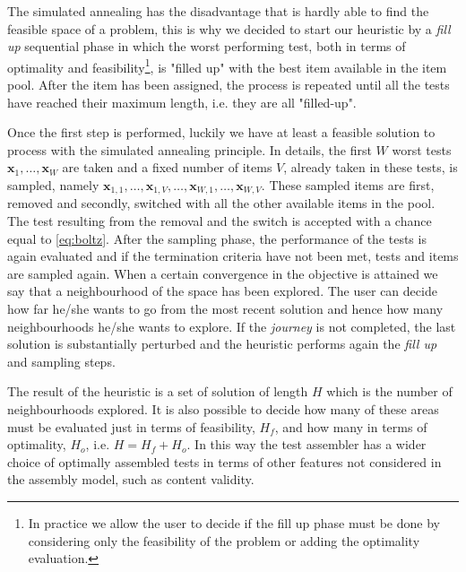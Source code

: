 The simulated annealing has the disadvantage that is hardly able to find the feasible space of a problem, this is why we decided to start our heuristic by a \emph{fill up} sequential phase in which the worst performing test, both in terms of optimality and feasibility\footnote{In practice we allow the user to decide if the fill up phase must be done by considering only the feasibility of the problem or adding the optimality evaluation.}, is "filled up" with the best item available in the item pool. After the item has been assigned, the process is repeated until all the tests have reached their maximum length, i.e. they are all "filled-up".

Once the first step is performed, luckily we have at least a feasible solution to process with the simulated annealing principle. In details, the first $W$ worst tests $\mathbf{x}_1,\ldots,\mathbf{x}_W$ are taken and a fixed number of items $V$, already taken in these tests, is sampled, namely $\mathbf{x}_{1,1},\ldots,\mathbf{x}_{1,V}, \ldots, \mathbf{x}_{W,1}, \ldots, \mathbf{x}_{W,V} $. These sampled items are first, removed and secondly, switched with all the other available items in the pool. The test resulting from the removal and the switch is accepted with a chance equal to \eqref{eq:boltz}. After the sampling phase, the performance of the tests is again evaluated and if the termination criteria have not been met, tests and items are sampled again. When a certain convergence in the objective is attained we say that a neighbourhood of the space has been explored. The user can decide how far he/she wants to go from the most recent solution and hence how many neighbourhoods he/she wants to explore. If the \emph{journey} is not completed, the last solution is substantially perturbed and the heuristic performs again the \emph{fill up} and sampling steps. 

The result of the heuristic is a set of solution of length $H$ which is the number of neighbourhoods explored. It is also possible to decide how many of these areas must be evaluated just in terms of feasibility, $H_f$, and how many in terms of optimality, $H_o$, i.e. $H=H_f+H_o$. In this way the test assembler has a wider choice of optimally assembled tests in terms of other features not considered in the assembly model, such as content validity.

